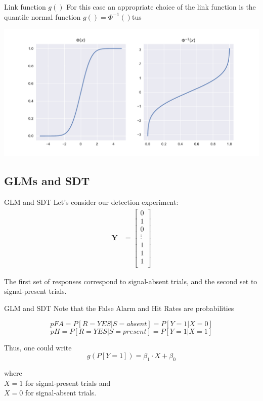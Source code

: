 \documentclass[10pt]{beamer}
\begin{document}
\begin{frame}{Link function $g()$}
For this case an appropriate choice of the link function is the quantile normal function $g() = \Phi^{-1}()$tus

\begin{center}
\includegraphics[scale=0.5]{figs/linkfun.pdf}
\end{center}

\end{frame}


\subsection{GLMs and SDT}
\begin{frame}{GLM and SDT}
Let's consider our detection experiment:
\begin{align*}
    \mathbf{Y}  &= 
    \begin{bmatrix}
           0 \\
           1 \\
           0 \\
           \vdots \\
           1 \\
           1 \\
           1 \\
    \end{bmatrix}
\end{align*}

The first set of responses correspond to signal-absent trials, and the second set to signal-present trials. 
\end{frame}

%
\begin{frame}{GLM and SDT}
Note that the False Alarm and Hit Rates are probabilities

$$ pFA = P[R=YES| S=absent] = P[Y=1 | X=0] $$
$$ pH =P[R=YES | S=present] = P[Y=1 | X=1] $$

Thus, one could write 
$$g(P[Y=1]) = \beta_1 \cdot X + \beta_0 $$

\hfill where \\
\hfill $X=1$ for signal-present trials and \\
\hfill $X=0$ for signal-absent trials.

\end{frame}
\end{document}
